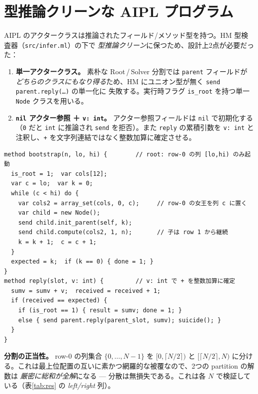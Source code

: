 \documentclass[11pt]{ltjsarticle}
\begin{document}
\section{型推論クリーンな AIPL プログラム}
AIPL のアクタークラスは推論されたフィールド/メソッド型を持つ。HM 型検査器（\texttt{src/infer.ml}）の下で
\emph{型推論クリーン}に保つため、設計上2点が必要だった：
\begin{enumerate}
  \item \textbf{単一アクタークラス。} 素朴な Root\,/\,Solver 分割では \texttt{parent} フィールドが
  \emph{どちらのクラスにもなり得る}ため、HM にユニオン型が無く \texttt{send parent.reply(\dots)} の単一化に
  失敗する。実行時フラグ \texttt{is\_root} を持つ単一 \texttt{Node} クラスを用いる。
  \item \textbf{\texttt{nil} アクター参照 ＋ \texttt{v:\,int}。} アクター参照フィールドは \texttt{nil}
  で初期化する（\texttt{0} だと \texttt{int} に推論され \texttt{send} を拒否）。また \texttt{reply} の累積引数を
  \texttt{v: int} と注釈し、\texttt{+} を文字列連結ではなく整数加算に確定させる。
\end{enumerate}

\begin{lstlisting}[caption={\texttt{dist\_nqueens\_xinu.abcl} の中核（row-0 分割）。}]
method bootstrap(n, lo, hi) {        // root: row-0 の列 [lo,hi) のみ起動
  is_root = 1;  var cols[12];
  var c = lo;  var k = 0;
  while (c < hi) do {
    var cols2 = array_set(cols, 0, c);     // row-0 の女王を列 c に置く
    var child = new Node();
    send child.init_parent(self, k);
    send child.compute(cols2, 1, n);       // 子は row 1 から継続
    k = k + 1;  c = c + 1;
  }
  expected = k;  if (k == 0) { done = 1; }
}
method reply(slot, v: int) {         // v: int で + を整数加算に確定
  sumv = sumv + v;  received = received + 1;
  if (received == expected) {
    if (is_root == 1) { result = sumv; done = 1; }
    else { send parent.reply(parent_slot, sumv); suicide(); }
  }
}
\end{lstlisting}

\noindent\textbf{分割の正当性。} row-0 の列集合 $\{0,\dots,N-1\}$ を $[0,\lceil N/2\rceil)$ と
$[\lceil N/2\rceil,N)$ に分ける。これは最上位配置の互いに素かつ網羅的な被覆なので、2つの partition の解数は
\emph{厳密に総和が全解}になる --- 分散は無損失である。これは各 $N$ で検証している（表\ref{tab:res} の
\textit{left/right} 列）。
\end{document}
